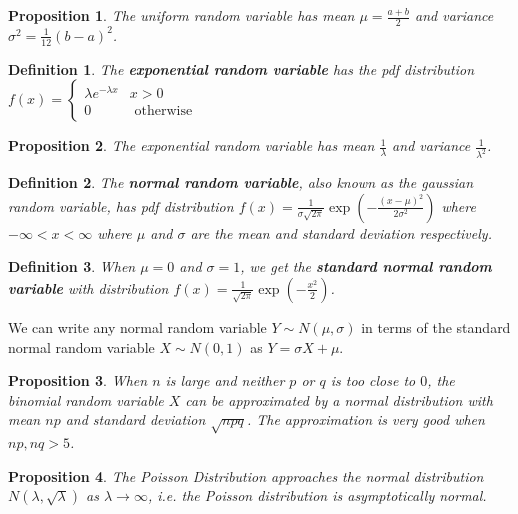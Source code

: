 \documentclass[14pt,twoside]{extreport}
\theoremstyle{dotless}
\newtheorem*{defn}{Definition}
\newtheorem*{prop}{Proposition} %
\begin{document}
\begin{prop}
The uniform random variable has mean $\mu = \frac{a + b}{2}$ and variance $\sigma^2 = \frac{1}{12} (b-a)^2$.
\end{prop}

\begin{defn}
    The \textbf{exponential random variable} has the pdf distribution $f(x) = \begin{cases} \lambda e^{-\lambda x} & x > 0 \\ 0 & \text{ otherwise } \end{cases}$
\end{defn}

\begin{prop}
The exponential random variable has mean $\frac{1}{\lambda}$ and variance $\frac{1}{\lambda^2}$.
\end{prop}

\begin{defn}
    The \textbf{normal random variable}, also known as the gaussian random variable, has pdf distribution $f(x) = \displaystyle \frac{1}{\sigma \sqrt{2 \pi}}  \exp\left(\displaystyle - \frac{(x-\mu)^2}{2 \sigma^2}\right)$ where $-\infty < x < \infty$ where $\mu$ and $\sigma$ are the mean and standard deviation respectively.
\end{defn}

\begin{defn}
When $\mu = 0$ and $\sigma = 1$, we get the \textbf{standard normal random variable} with distribution $f(x) = \displaystyle\frac{1}{\sqrt{2\pi}} \exp(-\frac{x^2}{2})$.
\end{defn}

We can write any normal random variable $Y \sim N(\mu, \sigma)$ in terms of the standard normal random variable $X \sim N(0,1)$ as $Y = \sigma X + \mu$.

\begin{prop}
    When $n$ is large and neither $p$ or $q$ is too close to $0$, the binomial random variable $X$ can be approximated by a normal distribution with mean $np$ and standard deviation $\sqrt{npq}$. The approximation is very good when $np, nq > 5$.
\end{prop}

\begin{prop}
    The Poisson Distribution approaches the normal distribution $N(\lambda, \sqrt{\lambda})$ as $\lambda \to \infty$, i.e. the Poisson distribution is asymptotically normal.
\end{prop}
\end{document}
